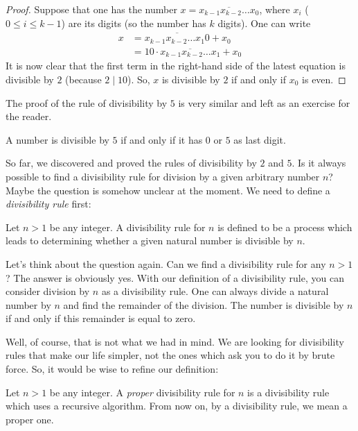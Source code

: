 \begin{proof}
	Suppose that one has the number $x = \overline{x_{k-1}x_{k-2} \ldots x_0}$, where $x_i$ ($0 \leq i \leq k-1$) are its digits (so the number has $k$ digits). One can write
		\begin{align*}
			x
				&= \overline{x_{k-1} x_{k-2} \ldots x_1 0} + x_0\\
				& = 10 \cdot \overline{x_{k-1} x_{k-2} \ldots x_1} + x_0
		\end{align*}
	It is now clear that the first term in the right-hand side of the latest equation is divisible by $2$ (because $2 \mid 10$). So, $x$ is divisible by $2$ if and only if $x_0$ is even.
\end{proof}

The proof of the rule of divisibility by $5$ is very similar and left as an exercise for the reader.

\begin{proposition}[Divisibility by $5$]
	A number is divisible by $5$ if and only if it has $0$ or $5$ as last digit.
\end{proposition}

So far, we discovered and proved the rules of divisibility by $2$ and $5$. Is it always possible to find a divisibility rule for division by a given arbitrary number $n$? Maybe the question is somehow unclear at the moment. We need to define a \textit{divisibility rule} first:

\begin{definition}
	Let $n>1$ be any integer. A divisibility rule for $n$ is defined to be a process which leads to determining whether a given natural number is divisible by $n$.
\end{definition}

Let's think about the question again. Can we find a divisibility rule for any $n>1$? The answer is obviously yes. With our definition of a divisibility rule, you can consider division by $n$ as a divisibility rule. One can always divide a natural number by $n$ and find the remainder of the division. The number is divisible by $n$ if and only if this remainder is equal to zero.

Well, of course, that is not what we had in mind. We are looking for divisibility rules that make our life simpler, not the ones which ask you to do it by brute force. So, it would be wise to refine our definition:

\begin{definition}
	Let $n>1$ be any integer. A \textit{proper} divisibility rule for $n$ is a divisibility rule which uses a recursive algorithm. From now on, by a divisibility rule, we mean a proper one.
\end{definition}

